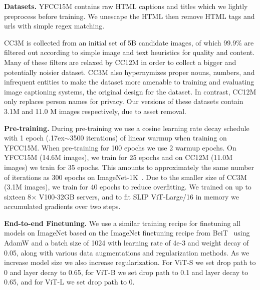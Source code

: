 \documentclass[10pt,twocolumn,letterpaper]{article}
\renewcommand{\paragraph}[1]{\vspace{1.25mm}\noindent\textbf{#1}}
\newcommand{\app}{\raise.17ex\hbox{$\scriptstyle\sim$}}
\begin{document}
\paragraph{Datasets.}
YFCC15M \cite{Radford2018ImprovingLU, Thomee2016YFCC100MTN} contains raw HTML captions and titles which we lightly preprocess before training.
We unescape the HTML then remove HTML tags and urls with simple regex matching.

CC3M \cite{Sharma2018ConceptualCA} is collected from an initial set of 5B candidate images, of which 99.9\% are filtered out according to simple image and text heuristics for quality and content.
Many of these filters are relaxed by CC12M \cite{Changpinyo2021Conceptual1P} in order to collect a bigger and potentially noisier dataset.
CC3M also hypernymizes proper nouns, numbers, and infrequent entities to make the dataset more amenable to training and evaluating image captioning systems, the original design for the dataset.
In contrast, CC12M only replaces person names for privacy.
Our versions of these datasets contain 3.1M and 11.0 M images respectively, due to asset removal.

\paragraph{Pre-training.}
During pre-training we use a cosine learning rate decay schedule with 1 epoch (\app 3500 iterations) of linear warmup when training on YFCC15M.
When pre-training for 100 epochs we use 2 warmup epochs.
On YFCC15M (14.6M images), we train for 25 epochs and on CC12M (11.0M images) we train for 35 epochs.
This amounts to approximately the same number of iterations as 300 epochs on ImageNet-1K~\cite{Russakovsky2015ImageNetLS}.
Due to the smaller size of CC3M (3.1M images), we train for 40 epochs to reduce overfitting.
We trained on up to sixteen 8$\times$ V100-32GB servers, and to fit SLIP ViT-Large/16 in memory we accumulated gradients over two steps.

\paragraph{End-to-end Finetuning.}
We use a similar training recipe for finetuning all models on ImageNet based on the ImageNet finetuning recipe from BeiT~\cite{Bao2021BEiTBP} using AdamW and a batch size of 1024 with learning rate of 4e-3 and weight decay of 0.05, along with various data augmentations and regularization methods.
As we increase model size we also increase regularization.
For ViT-S we set drop path to 0 and layer decay to 0.65, for ViT-B we set drop path to 0.1 and layer decay to 0.65, and for ViT-L we set drop path to 0. 
\end{document}
